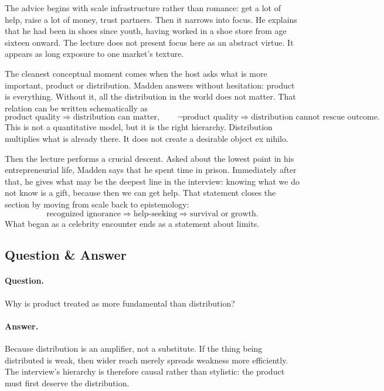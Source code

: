 The advice begins with scale infrastructure rather than romance: get a lot of help, raise a lot of money, trust partners. Then it narrows into focus. He explains that he had been in shoes since youth, having worked in a shoe store from age sixteen onward. The lecture does not present focus here as an abstract virtue. It appears as long exposure to one market's texture.

The cleanest conceptual moment comes when the host asks what is more important, product or distribution. Madden answers without hesitation: product is everything. Without it, all the distribution in the world does not matter. That relation can be written schematically as
\begin{equation}
\text{product quality} \Rightarrow \text{distribution can matter},
\qquad
\neg \text{product quality} \Rightarrow \text{distribution cannot rescue outcome}.
\end{equation}
This is not a quantitative model, but it is the right hierarchy. Distribution multiplies what is already there. It does not create a desirable object ex nihilo.

Then the lecture performs a crucial descent. Asked about the lowest point in his entrepreneurial life, Madden says that he spent time in prison. Immediately after that, he gives what may be the deepest line in the interview: knowing what we do not know is a gift, because then we can get help. That statement closes the section by moving from scale back to epistemology:
\begin{equation}
\text{recognized ignorance} \Rightarrow \text{help-seeking} \Rightarrow \text{survival or growth}.
\end{equation}
What began as a celebrity encounter ends as a statement about limits.

\subsection{Question \& Answer}

\paragraph{Question.} Why is product treated as more fundamental than distribution?

\paragraph{Answer.} Because distribution is an amplifier, not a substitute. If the thing being distributed is weak, then wider reach merely spreads weakness more efficiently. The interview's hierarchy is therefore causal rather than stylistic: the product must first deserve the distribution.

